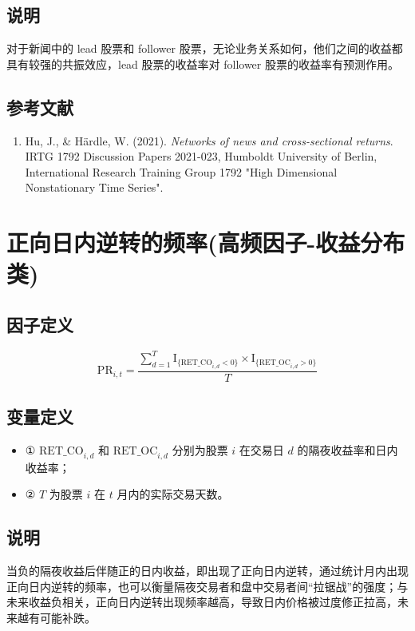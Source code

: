\documentclass{article}
\begin{document}
\subsection{说明}
对于新闻中的 lead 股票和 follower 股票，无论业务关系如何，他们之间的收益都具有较强的共振效应，lead 股票的收益率对 follower 股票的收益率有预测作用。

\subsection{参考文献}
\begin{enumerate}
    \item Hu, J., \& Härdle, W. (2021). \textit{Networks of news and cross-sectional returns}. IRTG 1792 Discussion Papers 2021-023, Humboldt University of Berlin, International Research Training Group 1792 "High Dimensional Nonstationary Time Series".
\end{enumerate}

\section{正向日内逆转的频率(高频因子-收益分布类)}

\subsection{因子定义}
\begin{equation}
    \mathrm{PR}_{i,t} = \frac{\sum_{d=1}^{T} \mathrm{I}_{\{\mathrm{RET\_CO}_{i,d}<0\}} \times \mathrm{I}_{\{\mathrm{RET\_OC}_{i,d}>0\}}}{T}
\end{equation}

\subsection{变量定义}
\begin{itemize}
    \item ① \( \mathrm{RET\_CO}_{i,d} \) 和 \( \mathrm{RET\_OC}_{i,d} \) 分别为股票 \( i \) 在交易日 \( d \) 的隔夜收益率和日内收益率；
    \item ② \( T \) 为股票 \( i \) 在 \( t \) 月内的实际交易天数。
\end{itemize}

\subsection{说明}
当负的隔夜收益后伴随正的日内收益，即出现了正向日内逆转，通过统计月内出现正向日内逆转的频率，也可以衡量隔夜交易者和盘中交易者间“拉锯战”的强度；与未来收益负相关，正向日内逆转出现频率越高，导致日内价格被过度修正拉高，未来越有可能补跌。
\end{document}
